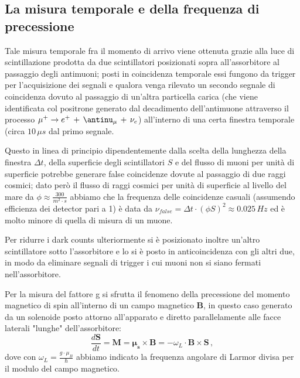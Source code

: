 \subsection{La misura temporale e della frequenza di precessione}
Tale misura temporale fra il momento di arrivo viene ottenuta grazie alla luce di scintillazione prodotta da due scintillatori posizionati sopra all'assorbitore al passaggio degli antimuoni; posti in coincidenza temporale essi fungono da trigger per l'acquisizione dei segnali e qualora venga rilevato un secondo segnale di coincidenza dovuto al passaggio di un'altra particella carica (che viene identificata col positrone generato dal decadimento dell'antimuone attraverso il processo $\mu^+ \to e^+ \, + \, \antinu_{\mu} \, + \, \nu_e$) all'interno di una certa finestra temporale (circa $10 \, \mu s$ dal primo segnale. \par
Questo in linea di principio dipendentemente dalla scelta della lunghezza della finestra $\Delta t$, della superficie degli scintillatori $S$ e del flusso di muoni per unità di superficie potrebbe generare false coincidenze dovute al passaggio di due raggi cosmici; dato però il flusso di raggi cosmici per unità di superficie al livello del mare da $\phi \approx\frac{300}{m^2 \cdot s}$ \cite{bib:Patrignani:2016xqp} abbiamo che la frequenza delle coincidenze casuali (assumendo efficienza dei detector pari a 1) è data da $\nu_{false}=\Delta t \cdot (\phi S)^2 \approx 0.025 \, Hz$ ed è molto minore di quella di misura di un muone. \par
Per ridurre i dark counts ulteriormente si è posizionato inoltre un'altro scintillatore sotto l'assorbitore e lo si è posto in anticoincidenza con gli altri due, in modo da eliminare segnali di trigger i cui muoni non si siano fermati nell'assorbitore. \par
{} \par
Per la misura del fattore g si sfrutta il fenomeno della precessione del momento magnetico di spin all'interno di un campo magnetico $\mathbf{B}$, in questo caso generato da un solenoide posto attorno all'apparato e diretto parallelamente alle facce laterali "lunghe" dell'assorbitore:
\begin{equation}
\frac{d\mathbf{S}}{dt}=\mathbf{M}=\bm{\mu_s}\times\mathbf{B}=-\omega_L \cdot \mathbf{B}\times\mathbf{S} \, ,
\end{equation}
dove con $\omega_L=\frac{g \cdot \mu_B}{\hbar}$ abbiamo indicato la frequenza angolare di Larmor divisa per il modulo del campo magnetico. \par
